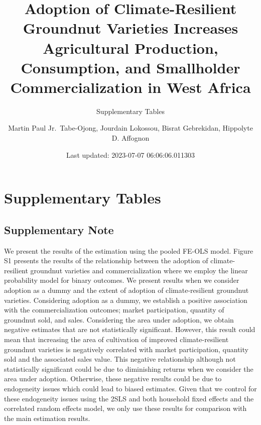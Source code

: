 \documentclass[
]{article}
\title{Adoption of Climate-Resilient Groundnut Varieties Increases Agricultural Production, Consumption, and Smallholder Commercialization in West Africa}
\subtitle{Supplementary Tables}
\author{Martin Paul Jr.~Tabe-Ojong, Jourdain Lokossou, Bisrat Gebrekidan, Hippolyte D. Affognon}
\date{Last updated: 2023-07-07 06:06:06.011303}
\begin{document}
\maketitle

\newpage
\tableofcontents
\newpage
\listoftables
\newpage

\newpage

\newpage

\hypertarget{supplementary-tables}{%
\section{Supplementary Tables}\label{supplementary-tables}}

\hypertarget{supplementary-note}{%
\subsection{Supplementary Note}\label{supplementary-note}}

We present the results of the estimation using the pooled FE-OLS model. Figure S1 presents the results of the relationship between the adoption of climate-resilient groundnut varieties and commercialization where we employ the linear probability model for binary outcomes. We present results when we consider adoption as a dummy and the extent of adoption of climate-resilient groundnut varieties. Considering adoption as a dummy, we establish a positive association with the commercialization outcomes; market participation, quantity of groundnut sold, and sales. Considering the area under adoption, we obtain negative estimates that are not statistically significant. However, this result could mean that increasing the area of cultivation of improved climate-resilient groundnut varieties is negatively correlated with market participation, quantity sold and the associated sales value. This negative relationship although not statistically significant could be due to diminishing returns when we consider the area under adoption. Otherwise, these negative results could be due to endogeneity issues which could lead to biased estimates. Given that we control for these endogeneity issues using the 2SLS and both household fixed effects and the correlated random effects model, we only use these results for comparison with the main estimation results.
\end{document}
